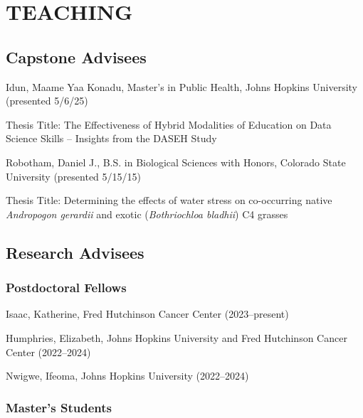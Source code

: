 \documentclass{cv}
\begin{document}

\newpage
{}
\parttwo



\section*{TEACHING}


\subsection*{Capstone Advisees}

Idun, Maame Yaa Konadu, Master's in Public Health, Johns Hopkins University (presented 5/6/25)

Thesis Title: The Effectiveness of Hybrid Modalities of Education on Data Science Skills – Insights from the DASEH Study

Robotham, Daniel J., B.S. in Biological Sciences with Honors, Colorado State University (presented 5/15/15)

Thesis Title: Determining the effects of water stress on co-occurring native \textit{Andropogon gerardii} and exotic (\textit{Bothriochloa bladhii}) C4 grasses

\subsection*{Research Advisees}

\subsubsection*{Postdoctoral Fellows}

Isaac, Katherine, Fred Hutchinson Cancer Center (2023--present)

Humphries, Elizabeth, Johns Hopkins University and Fred Hutchinson Cancer Center (2022--2024)

Nwigwe, Ifeoma, Johns Hopkins University (2022--2024)

\subsubsection*{Master's Students}
\end{document}
